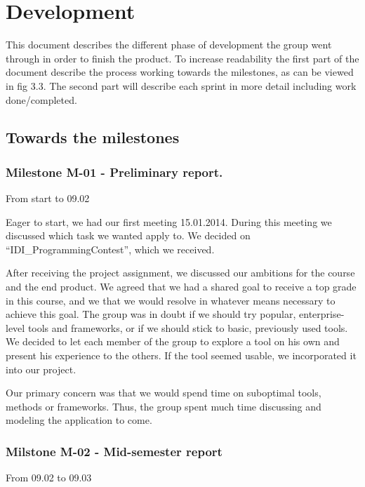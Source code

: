 
\chapter{Development}

This document describes the different phase of development the group
went through in order to finish the product. To increase readability
the first part of the document describe the process working towards the
milestones, as can be viewed in fig 3.3. The second part will describe
each sprint in more detail including work done/completed. 




\section{Towards the milestones}




\subsection{Milestone M-01 - Preliminary report.}
\label{sec:M01}

From start to 09.02

Eager to start, we had our first meeting 15.01.2014. During this meeting
we discussed which task we wanted apply to. We decided on
``IDI\_ProgrammingContest'', which
we received. 




After receiving the project assignment, we discussed our ambitions for
the course and the end product. We agreed that we had a shared goal to
receive a top grade in this course, and we that we would resolve in
whatever means necessary to achieve this goal. The group was in doubt
if we should try popular, enterprise-level tools and frameworks, or if
we should stick to basic, previously used tools. We decided to let each
member of the group to explore a tool on his own and present his
experience to the others. If the tool seemed usable, we incorporated it
into our project.




Our primary concern was that we would spend time on suboptimal tools,
methods or frameworks. Thus, the group spent much time discussing and
modeling the application to come. 




\subsection{Milstone M-02 - Mid-semester report}
\label{sec:M02}
From 09.02 to 09.03

